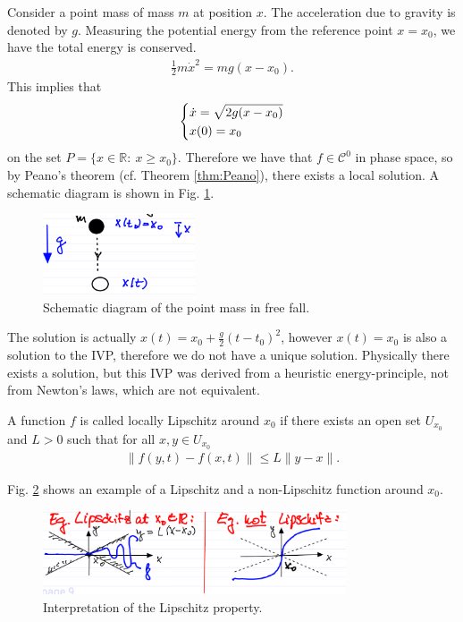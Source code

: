 \begin{ex}
	Consider a point mass of mass $m$ at position $x$. The acceleration due to gravity is denoted by $g$. Measuring the potential energy from the reference point $x=x_0$, we have the total energy is conserved.
	\begin{align}
		\frac{1}{2} m \dot{x}^2 = mg(x-x_0).
	\end{align}
This implies that
\begin{align}
	\begin{dcases}
		\dot{x} = \sqrt{2g(x-x_0)} \\
		x(0) = x_0
	\end{dcases}
\end{align}
on the set $P = \{ x \in \mathbb{R}:\ x \geq x_0\}$. Therefore we have that $f\in \mathcal{C}^0$ in phase space, so by Peano's theorem (cf. Theorem \ref{thm:Peano}), there exists a local solution. A schematic diagram is shown in Fig. \ref{fig:point_mass}. 
	\begin{figure}[h!]
		\centering
		\includegraphics[width=0.4\textwidth]{figures/ch1/1freefall.png}
		\caption{Schematic diagram of the point mass in free fall.}
		\label{fig:point_mass}
	\end{figure}
	The solution is actually $x(t) = x_0 + \frac{g}{2}(t-t_0)^2$, however $x(t) = x_0$ is also a solution to the IVP, therefore we do not have a unique solution. Physically there exists a solution, but this IVP was derived from a heuristic energy-principle, not from Newton's laws, which are not equivalent.
\end{ex}
\begin{definition}
A function $f$ is called locally Lipschitz around $ {x}_0$ if there exists an open set $U_{ {x}_0}$ and $L>0$ such that for all $ {x}, {y} \in U_{ {x}_0}$
\begin{align}
	\boxed{\left \| f( {y},t) - f( {x},t)\right \| \leq L  \| {y} -  {x} \|.}
\end{align}
\end{definition}

\begin{ex}
	Fig. \ref{fig:Lipschitz_ex} shows an example of a Lipschitz and a non-Lipschitz function around $x_0$.
	\begin{figure}[h!]
		\centering
		\includegraphics[width=0.8\textwidth]{figures/ch1/2lipschitz.png}
		\caption{Interpretation of the Lipschitz property.}
		\label{fig:Lipschitz_ex}
	\end{figure}
\end{ex}

